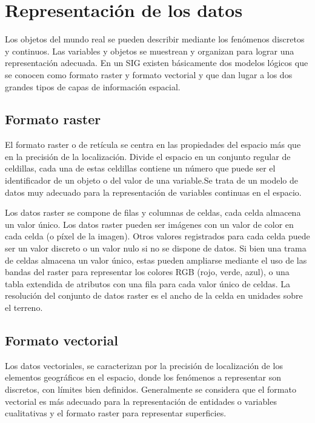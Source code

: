 \section{Representación de los datos }
\label{sec:cap2-tecnicas-graficas-representacion}

Los objetos del mundo real se pueden describir mediante los fenómenos discretos y continuos. Las variables y
objetos se muestrean y organizan para lograr una representación adecuada. En un SIG existen básicamente dos
modelos lógicos que se conocen como formato raster y formato vectorial y que dan lugar a los dos grandes tipos
de capas de información espacial.

\subsection{Formato raster}
El formato raster o de retícula se centra en las propiedades del espacio más que en la precisión de la localización. Divide
el espacio en un conjunto regular de celdillas, cada una de estas celdillas contiene un número que puede ser el identificador
de un objeto o del valor de una variable.Se trata de un modelo de datos muy adecuado para la representación de variables
continuas en el espacio.

Los datos raster se compone de filas y columnas de celdas, cada celda almacena un valor único. Los datos raster pueden ser imágenes
con un valor de color en cada celda (o píxel de la imagen). Otros valores registrados para cada celda puede ser un valor discreto o
un valor nulo si no se dispone de datos. Si bien una trama de celdas almacena un valor único, estas pueden ampliarse mediante el
uso de las bandas del raster para representar los colores RGB (rojo, verde, azul), o una tabla extendida de atributos con una
fila para cada valor único de celdas. La resolución del conjunto de datos raster es el ancho de la celda en unidades sobre el
terreno.

\subsection{Formato vectorial}
Los datos vectoriales, se caracterizan por la precisión de localización de los elementos geográficos en el espacio, donde
los fenómenos a representar son discretos, con límites bien definidos. Generalmente se considera que el formato vectorial
es más adecuado para la representación de entidades o variables cualitativas y el formato raster para representar superficies.



